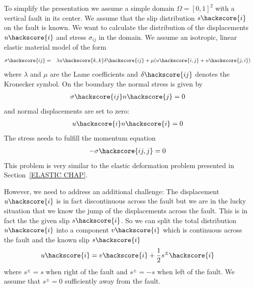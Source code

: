 To simplify the presentation we assume a simple domain $\Omega=[0,1]^2$ with
a vertical fault in its center. We assume that the slip distribution $s\hackscore{i}$ on the fault is known. We want to calculate the distribution of the displacements $u\hackscore{i}$ and stress $\sigma_{ij}$ in the domain. We assume an isotropic, linear elastic material model of the form
\begin{eqnarray} \label{Slip  stress}
\sigma\hackscore{ij} & = & \lambda u\hackscore{k,k} \delta\hackscore{ij} + \mu ( u\hackscore{i,j} + u\hackscore{j,i})
\end{eqnarray}
where $\lambda$ and $\mu$ are the Lame coefficients 
 and $\delta\hackscore{ij}$ denotes the Kronecker symbol.
On the boundary the normal stress is given by
\begin{eqnarray} \label{Slip natural fault}
\sigma\hackscore{ij}n\hackscore{j}=0
\end{eqnarray}
and normal displacements are set to zero:
\begin{eqnarray} \label{Slip constraint}
u\hackscore{i}n\hackscore{i} =0 
\end{eqnarray}
The stress needs to fulfill the momentum equation
\begin{eqnarray}\label{Slip general problem}
- \sigma\hackscore{ij,j}=0
\end{eqnarray}
This problem is very similar to the elastic deformation problem presented in Section~\ref{ELASTIC CHAP}.

However, we need to address an additional challenge: The displacement $u\hackscore{i}$ is in fact discontinuous across the fault
but we are in the lucky situation that we know the jump of the displacements across the fault. This is
in fact the the given slip $s\hackscore{i}$. So we can split the total distribution $u\hackscore{i}$ into a component $v\hackscore{i}$ 
which is continuous across the fault and the known slip $s\hackscore{i}$
\begin{eqnarray}\label{Slip Split}
u\hackscore{i} = v\hackscore{i} + \frac{1}{2} s^{\pm}\hackscore{i}
\end{eqnarray}
where $s^{\pm}=s$ when right of the fault and $s^{\pm}=-s$ 
when left of the fault. We assume that $s^{\pm}=0$ sufficiently away from the fault.

